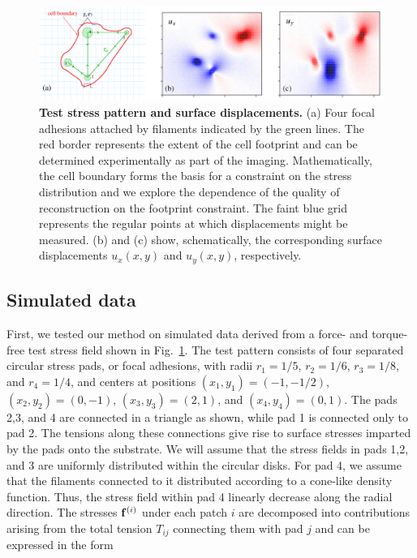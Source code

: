 \documentclass[aps,prl,reprint,groupedaddress,twocolumn]{revtex4-1}
\def\f{{\bf f}}
\newcommand{\add}{\added}
\begin{document}
\begin{figure}
\begin{center}
\includegraphics[width=5.6in]{fig2.pdf}
%
\caption{\textbf{Test stress pattern and surface displacements.} (a)
  Four focal adhesions attached by filaments indicated by the green
  lines. The red border represents the extent of the cell footprint
  and can be determined experimentally as part of the imaging.
  Mathematically, the cell boundary forms the basis for a constraint
  on the stress distribution and we explore the dependence of the
  quality of reconstruction on the footprint constraint. The faint
  blue grid represents the regular points at which displacements might
  be measured. (b) and (c) show, schematically, the corresponding surface
  displacements $u_{x}(x,y)$ and $u_{y}(x,y)$,
  respectively.\label{TEST}}
\end{center}
\end{figure}

\subsection{Simulated data}

First, we tested our method on simulated data derived from a force-
and torque-free test stress field shown in Fig.~\ref{TEST}. The test
pattern consists of four separated circular stress pads, or focal
adhesions, with radii $r_{1} = 1/5$, $r_{2} = 1/6$, $r_{3} = 1/8$, and
$r_{4} = 1/4$, and centers at positions $(x_{1},y_{1}) = (-1,-1/2)$,
$(x_{2},y_{2}) = (0,-1)$, $(x_{3},y_{3}) = (2,1)$, and $(x_{4},y_{4})
= (0,1)$.  The pads 2,3, and 4 are connected in a triangle as shown,
while pad 1 is connected only to pad 2.  The tensions along these
connections give rise to surface stresses imparted by the pads onto
the substrate.  We will assume that the stress fields in pads 1,2, and
3 are uniformly distributed within the circular disks. For pad 4, we
assume that the filaments connected to it \add{are} distributed according to a
cone-like density function. Thus, the stress field within pad 4
linearly decrease along the radial direction. The stresses $\f^{(i)}$
under each patch $i$ are decomposed into contributions arising from
the total tension $T_{ij}$ connecting them with pad $j$ and can be
expressed in the form
\end{document}
